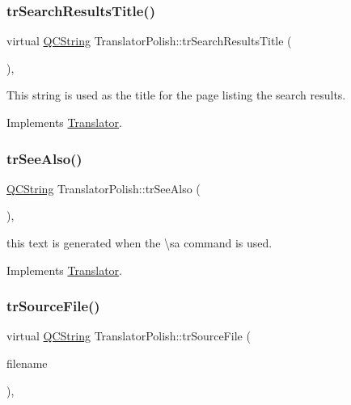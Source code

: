 \subsubsection{\texorpdfstring{trSearchResultsTitle()}{trSearchResultsTitle()}}
{\footnotesize\ttfamily virtual \mbox{\hyperlink{class_q_c_string}{Q\+C\+String}} Translator\+Polish\+::tr\+Search\+Results\+Title (\begin{DoxyParamCaption}{ }\end{DoxyParamCaption})\hspace{0.3cm}{\ttfamily [inline]}, {\ttfamily [virtual]}}

This string is used as the title for the page listing the search results. 

Implements \mbox{\hyperlink{class_translator}{Translator}}.

\mbox{\label{class_translator_polish_a1723e67cd770fb5becba21fb81a7e6f0}} 
\subsubsection{\texorpdfstring{trSeeAlso()}{trSeeAlso()}}
{\footnotesize\ttfamily \mbox{\hyperlink{class_q_c_string}{Q\+C\+String}} Translator\+Polish\+::tr\+See\+Also (\begin{DoxyParamCaption}{ }\end{DoxyParamCaption})\hspace{0.3cm}{\ttfamily [inline]}, {\ttfamily [virtual]}}

this text is generated when the \textbackslash{}sa command is used. 

Implements \mbox{\hyperlink{class_translator}{Translator}}.

\mbox{\label{class_translator_polish_ad83481d0c95415c183e3b9ac5420e28e}} 
\subsubsection{\texorpdfstring{trSourceFile()}{trSourceFile()}}
{\footnotesize\ttfamily virtual \mbox{\hyperlink{class_q_c_string}{Q\+C\+String}} Translator\+Polish\+::tr\+Source\+File (\begin{DoxyParamCaption}\item[{\mbox{\hyperlink{class_q_c_string}{Q\+C\+String}} \&}]{filename }\end{DoxyParamCaption})\hspace{0.3cm}{\ttfamily [inline]}, {\ttfamily [virtual]}}

